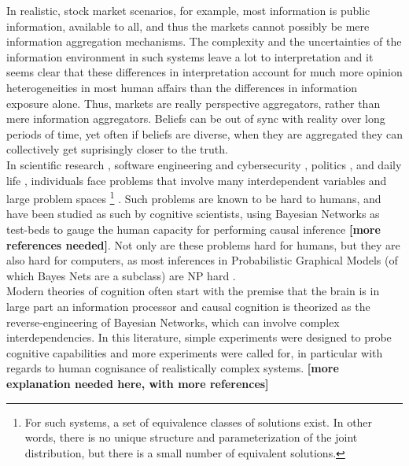 In realistic, stock market scenarios, for example, most information is public information, available to all, and thus the markets cannot possibly be mere information aggregation mechanisms. The complexity and the uncertainties of the information environment in such systems leave a lot to interpretation and it seems clear that these differences in interpretation account for much more opinion heterogeneities in most human affairs than the differences in information exposure alone. Thus, markets are really perspective aggregators, rather than mere information aggregators. Beliefs can be out of sync with reality over long periods of time, yet often if beliefs are diverse, when they are aggregated they can collectively get suprisingly closer to the truth. \\

In scientific research \cite{hisano2013challenges}, software engineering and cybersecurity \cite{littlewood1989predicting,maillart2017given}, politics \cite{clinton2014hard}, and daily life \cite{gerson1986hard}, individuals face problems that involve many interdependent variables and large problem spaces \footnote{For such systems, a set of equivalence classes of solutions exist. In other words, there is no unique structure and parameterization of the joint distribution, but there is a small number of equivalent solutions.} \cite{koller09, Pearl2009CMR}. Such problems are known to be hard to humans, and have been studied as such by cognitive scientists, using Bayesian Networks as test-beds to gauge the human capacity for performing causal inference \cite{bramley2015staying} {\bf [more references needed]}. Not only are these problems hard for humans, but they are also hard for computers, as most inferences in Probabilistic Graphical Models (of which Bayes Nets are a subclass) are NP hard \cite{koller09}.\\ 

Modern theories of cognition often start with the premise that the brain is in large part an information processor \cite{Tenenbaum06theory-basedbayesian} and causal cognition is theorized as the reverse-engineering of Bayesian Networks, which can involve complex interdependencies. In this literature, simple experiments were designed to probe cognitive capabilities \cite{tenenbaum2001structure} and more experiments were called for, in particular with regards to human cognisance of realistically complex systems. {\bf [more explanation needed here, with more references]}\\

